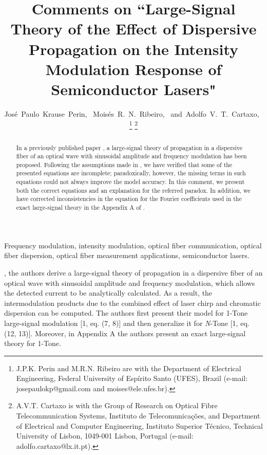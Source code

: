 \documentclass[journal]{IEEEtran}
\makeatletter
\def\markboth#1#2{\def\leftmark{\@IEEEcompsoconly{\sffamily}\MakeUppercase{\protect#1}}%
\def\rightmark{\@IEEEcompsoconly{\sffamily}\MakeUppercase{\protect#2}}}
\makeatother
\begin{document}
\title{Comments on ``Large-Signal Theory of the Effect of Dispersive Propagation on the Intensity Modulation Response of Semiconductor Lasers"}
\author{José~Paulo~Krause~Perin,~\IEEEmembership{}
        Moisés~R.~N.~Ribeiro,~\IEEEmembership{}
        and~Adolfo~V.~T.~Cartaxo,~%
\thanks{J.P.K. Perin and M.R.N. Ribeiro are with the Department
of Electrical Engineering, Federal University of Espírito Santo (UFES), Brazil (e-mail: josepaulokp@gmail.com and moises@ele.ufes.br).}%
\thanks{A.V.T. Cartaxo is with the Group of Research on Optical Fibre Telecommunication Systems, Instituto de Telecomunicações, and Department of Electrical and
Computer Engineering, Instituto Superior Técnico, Technical University of Lisbon, 1049-001 Lisbon, Portugal (e-mail: adolfo.cartaxo@lx.it.pt).}%
}

\markboth{JOURNAL OF LIGHTWAVE TECHNOLOGY, VOL. ~XX, NO. ~X, JANUARY ~XXXX}%
{Shell \MakeLowercase{\textit{et al.}}: Bare Demo of IEEEtran.cls for Journals}
\maketitle
\begin{abstract}
In a previously published paper \cite{eva}, a large-signal theory of propagation in a dispersive fiber of an optical wave with sinusoidal amplitude and frequency modulation has been proposed. Following the assumptions made in \cite{eva}, we have verified that some of the presented equations are incomplete; paradoxically, however, the missing terms in such equations could not always improve the model accuracy. In this comment, we present both the correct equations and an explanation for the referred paradox. In addition, we have corrected inconsistencies in the equation for the Fourier coefficients used in the exact large-signal theory in the Appendix A of \cite{eva}.
\end{abstract}

\begin{IEEEkeywords}
Frequency modulation, intensity modulation, optical fiber communication, optical fiber dispersion, optical fiber
measurement applications, semiconductor lasers.
\end{IEEEkeywords}

\IEEEpeerreviewmaketitle
{} \cite{eva}, the authors derive a large-signal theory of propagation in a dispersive fiber of an optical wave with sinusoidal amplitude and frequency modulation, which allows the detected current to be analytically calculated. As a result, the intermodulation products due to the combined effect of laser chirp and chromatic dispersion can be computed. The authors first present their model for 1-Tone large-signal modulation [1, eq. (7, 8)] and then generalize it for \emph{N}-Tone [1, eq.  (12, 13)]. Moreover, in Appendix A the authors present an exact large-signal theory for 1-Tone.
\end{document}
